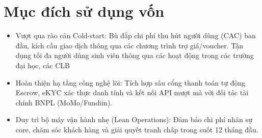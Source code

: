 \section{Mục đích sử dụng vốn}
\begin{itemize}
    \item Vượt qua rào cản Cold-start: Bù đắp chi phí thu hút người dùng (CAC) ban đầu, kích cầu giao dịch thông qua các chương trình trợ giá/voucher. Tận dụng tối đa người dùng sinh viên thông qua các hoạt động trong các trường đại học, các CLB
    \item Hoàn thiện hạ tầng công nghệ lõi: Tích hợp sâu cổng thanh toán tự động Escrow, eKYC xác thực danh tính và kết nối API mượt mà với đối tác tài chính BNPL (MoMo/Fundiin).
    \item Duy trì bộ máy vận hành nhẹ (Lean Operations): Đảm bảo chi phí nhân sự core, chăm sóc khách hàng và giải quyết tranh chấp trong suốt 12 tháng đầu.
\end{itemize}
